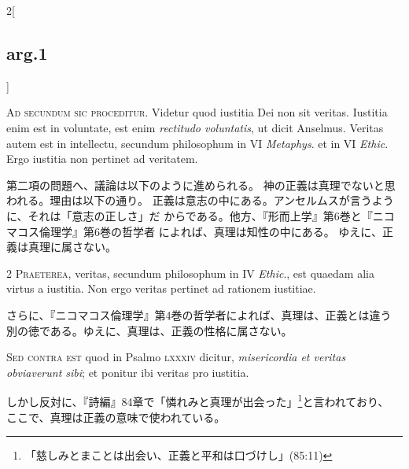 \documentclass[paper=a4paper,fontsize=10pt,jafontsize=9pt,titlepage]{jlreq}
\begin{document}
\begin{paracol}{2}[\subsection{arg.1}]

{\Huge A}{\scshape d secundum sic proceditur}. Videtur quod
iustitia Dei non sit veritas. Iustitia enim est in voluntate, est enim
{\itshape rectitudo voluntatis}, ut dicit Anselmus. Veritas autem est in
intellectu, secundum philosophum in VI {\itshape Metaphys}. et in VI {\itshape Ethic}. Ergo
iustitia non pertinet ad veritatem.

\switchcolumn

第二項の問題へ、議論は以下のように進められる。
神の正義は真理でないと思われる。理由は以下の通り。
正義は意志の中にある。アンセルムスが言うように、それは「意志の正しさ」だ
 からである。他方、『形而上学』第6巻と『ニコマコス倫理学』第6巻の哲学者
 によれば、真理は知性の中にある。
ゆえに、正義は真理に属さない。


{\scshape 2 Praeterea}, veritas, secundum philosophum in
IV {\itshape Ethic}., est quaedam alia virtus a iustitia. Non ergo veritas pertinet
ad rationem iustitiae.

\switchcolumn

さらに、『ニコマコス倫理学』第4巻の哲学者によれば、真理は、正義とは違う
 別の徳である。ゆえに、真理は、正義の性格に属さない。

\switchcolumn*[\subsection{s.c.}]

{\scshape Sed contra est} quod in Psalmo {\scshape lxxxiv}
dicitur, {\itshape misericordia et veritas obviaverunt sibi}; et ponitur ibi
veritas pro iustitia.

\switchcolumn

しかし反対に、『詩編』84章で「憐れみと真理が出会った」\footnote{「慈しみとまことは出会い、正義と平和は口づけし」(85:11)}と言われており、
 ここで、真理は正義の意味で使われている。



\end{paracol}
\end{document}
